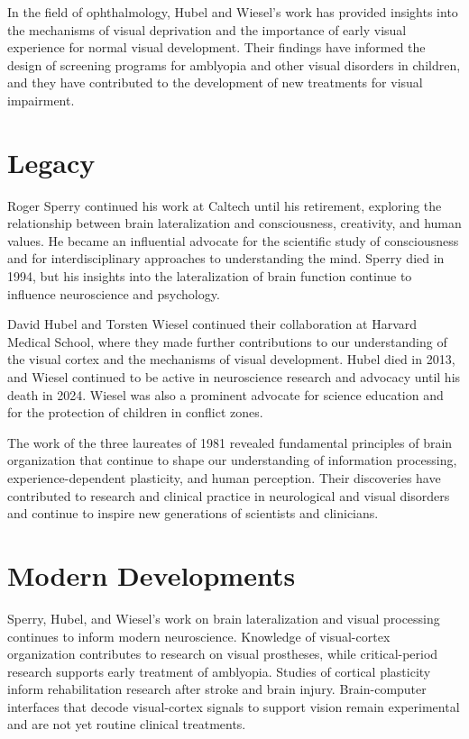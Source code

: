 In the field of ophthalmology, Hubel and Wiesel's work has provided insights into the mechanisms of visual deprivation and the importance of early visual experience for normal visual development. Their findings have informed the design of screening programs for amblyopia and other visual disorders in children, and they have contributed to the development of new treatments for visual impairment.

\section{Legacy}

Roger Sperry continued his work at Caltech until his retirement, exploring the relationship between brain lateralization and consciousness, creativity, and human values. He became an influential advocate for the scientific study of consciousness and for interdisciplinary approaches to understanding the mind. Sperry died in 1994, but his insights into the lateralization of brain function continue to influence neuroscience and psychology.

David Hubel and Torsten Wiesel continued their collaboration at Harvard Medical School, where they made further contributions to our understanding of the visual cortex and the mechanisms of visual development. Hubel died in 2013, and Wiesel continued to be active in neuroscience research and advocacy until his death in 2024. Wiesel was also a prominent advocate for science education and for the protection of children in conflict zones.

The work of the three laureates of 1981 revealed fundamental principles of brain organization that continue to shape our understanding of information processing, experience-dependent plasticity, and human perception. Their discoveries have contributed to research and clinical practice in neurological and visual disorders and continue to inspire new generations of scientists and clinicians.


\section{Modern Developments}

Sperry, Hubel, and Wiesel's work on brain lateralization and visual processing continues to inform modern neuroscience. Knowledge of visual-cortex organization contributes to research on visual prostheses, while critical-period research supports early treatment of amblyopia. Studies of cortical plasticity inform rehabilitation research after stroke and brain injury. Brain-computer interfaces that decode visual-cortex signals to support vision remain experimental and are not yet routine clinical treatments.


